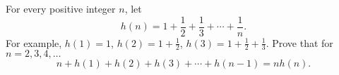 For every positive integer $n$,  let \[h(n) = 1+\frac{1}{2}+\frac{1}{3}+\cdots+\frac{1}{n}.\] For example, $h(1) = 1$,  $h(2) = 1+\frac{1}{2}$,  $h(3) = 1+\frac{1}{2}+\frac{1}{3}$. Prove that for $n=2,3,4,\ldots$ \[n+h(1)+h(2)+h(3)+\cdots+h(n-1) = nh(n).\]